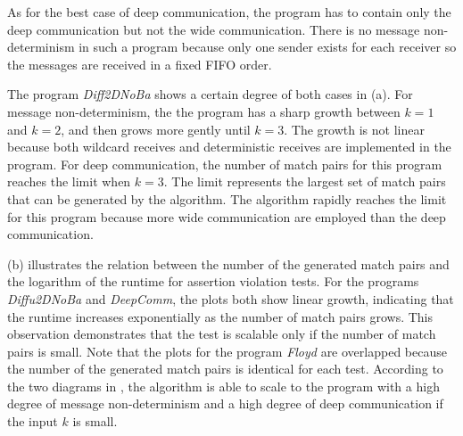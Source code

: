 As for the best case of deep communication, the program has to contain only the deep communication but not the wide communication. There is no message non-determinism in such a program because only one sender exists for each receiver so the messages are received in a fixed FIFO order.

The program \textit{Diff2DNoBa} shows a certain degree of both cases in  (a). For message non-determinism, the the program has a sharp growth between $k=1$ and $k=2$, and then grows more gently until $k=3$. The growth is not linear because both wildcard receives and deterministic receives are implemented in the program. For deep communication, the number of match pairs for this program reaches the limit when $k=3$. The limit represents the largest set of match pairs that can be generated by the algorithm. The algorithm rapidly reaches the limit for this program because more wide communication are employed than the deep communication.  

 (b) illustrates the relation between the number of the generated match pairs and the logarithm of the runtime for assertion violation tests. 
For the programs \textit{Diffu2DNoBa} and \textit{DeepComm}, the plots both show linear growth, indicating that the runtime increases exponentially as the number of match pairs grows. 
This observation demonstrates that the test is scalable only if the number of match pairs is small. 
Note that the plots for the program \textit{Floyd} are overlapped because the number of the generated match pairs is identical for each test.
According to the two diagrams in , the algorithm is able to scale to the program with a high degree of message non-determinism and a high degree of deep communication if the input $k$ is small.
